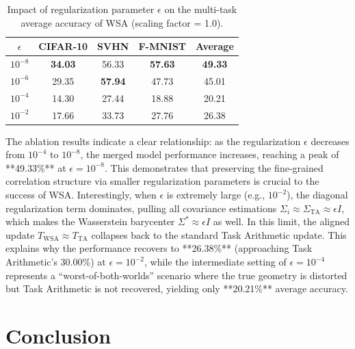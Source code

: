 \documentclass{article}
\theoremstyle{plain}
\theoremstyle{definition}
\theoremstyle{remark}
\begin{document}
\begin{table}[h]
  \caption{Impact of regularization parameter $\epsilon$ on the multi-task average accuracy of WSA (scaling factor = 1.0).}
  \label{tab:ablation_eps}
  \vskip 0.1in
  \begin{center}
    \begin{small}
      \begin{tabular}{ccccc}
        \toprule
        $\epsilon$ & \textbf{CIFAR-10} & \textbf{SVHN} & \textbf{F-MNIST} & \textbf{Average} \\
        \midrule
        $10^{-8}$ & \textbf{34.03} & 56.33 & \textbf{57.63} & \textbf{49.33} \\
        $10^{-6}$ & 29.35 & \textbf{57.94} & 47.73 & 45.01 \\
        $10^{-4}$ & 14.30 & 27.44 & 18.88 & 20.21 \\
        $10^{-2}$ & 17.66 & 33.73 & 27.76 & 26.38 \\
        \bottomrule
      \end{tabular}
    \end{small}
  \end{center}
\end{table}

The ablation results indicate a clear relationship: as the regularization $\epsilon$ decreases from $10^{-4}$ to $10^{-8}$, the merged model performance increases, reaching a peak of **49.33\%** at $\epsilon = 10^{-8}$. This demonstrates that preserving the fine-grained correlation structure via smaller regularization parameters is crucial to the success of WSA. Interestingly, when $\epsilon$ is extremely large (e.g., $10^{-2}$), the diagonal regularization term dominates, pulling all covariance estimations $\Sigma_i \approx \Sigma_{\text{TA}} \approx \epsilon I$, which makes the Wasserstein barycenter $\Sigma^* \approx \epsilon I$ as well. In this limit, the aligned update $T_{\text{WSA}} \approx T_{\text{TA}}$ collapses back to the standard Task Arithmetic update. This explains why the performance recovers to **26.38\%** (approaching Task Arithmetic's 30.00\%) at $\epsilon = 10^{-2}$, while the intermediate setting of $\epsilon = 10^{-4}$ represents a ``worst-of-both-worlds'' scenario where the true geometry is distorted but Task Arithmetic is not recovered, yielding only **20.21\%** average accuracy.

\section{Conclusion}
\label{submission-conclusion}
\end{document}
